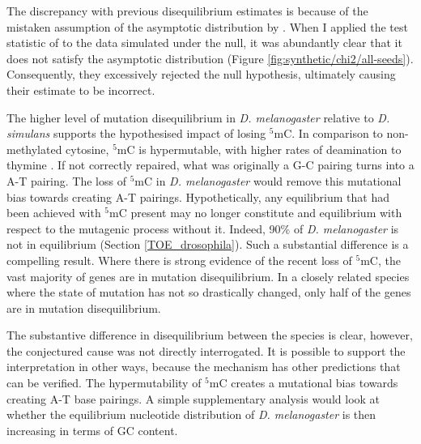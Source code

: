 The discrepancy with previous disequilibrium estimates is because of the mistaken assumption of the asymptotic distribution by \cite{Squartini2008QuantifyingProcess}. When I applied the test statistic of \cite{Squartini2008QuantifyingProcess} to the data simulated under the null, it was abundantly clear that it does not satisfy the asymptotic distribution (Figure \ref{fig:synthetic/chi2/all-seeds}). Consequently, they excessively rejected the null hypothesis, ultimately causing their estimate to be incorrect.

The higher level of mutation disequilibrium in \textit{D. melanogaster} relative to \textit{D. simulans} supports the hypothesised impact of losing $^5$mC. In comparison to non-methylated cytosine, $^5$mC is hypermutable, with higher rates of deamination to thymine \citep{Shen1994TheDNA, Coulondre1978MolecularColi}. If not correctly repaired, what was originally a G-C pairing turns into a A-T pairing. The loss of $^5$mC in \textit{D. melanogaster} would remove this mutational bias towards creating A-T pairings. Hypothetically, any equilibrium that had been achieved with $^5$mC present may no longer constitute and equilibrium with respect to the mutagenic process without it. Indeed, 90\% of \textit{D. melanogaster} is not in equilibrium (Section \ref{TOE_drosophila}). Such a substantial difference is a compelling result. Where there is strong evidence of the recent loss of $^5$mC, the vast majority of genes are in mutation disequilibrium. In a closely related species where the state of mutation has not so drastically changed, only half of the genes are in mutation disequilibrium.

The substantive difference in disequilibrium between the species is clear, however, the conjectured cause was not directly interrogated. It is possible to support the interpretation in other ways, because the mechanism has other predictions that can be verified. The hypermutability of $^5$mC creates a mutational bias towards creating A-T base pairings. A simple supplementary analysis would look at whether the equilibrium nucleotide distribution of \textit{D. melanogaster} is then increasing in terms of GC content. 

